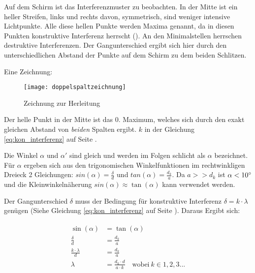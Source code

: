 Auf dem Schirm ist das Interferenzmuster zu beobachten. In der Mitte ist ein heller Streifen, links und rechts davon, symmetrisch, sind weniger intensive Lichtpunkte. Alle diese hellen Punkte werden Maxima genannt, da in diesen Punkten konstruktive Interferenz herrscht (). An den Minimalstellen herrschen destruktive Interferenzen. Der Gangunterschied ergibt sich hier durch den unterschiedlichen Abstand der Punkte auf dem Schirm zu dem beiden Schlitzen.

Eine Zeichnung:

\begin{figure}[h!]
		\centering
		\texttt{[image: doppelspaltzeichnung]}
		\caption{Zeichnung zur Herleitung}
\end{figure}

Der helle Punkt in der Mitte ist das 0. Maximum, welches sich durch den exakt gleichen Abstand von \emph{beiden} Spalten ergibt. $k$ in der Gleichung \ref{eq:kon_interferenz} auf Seite \pageref{eq:kon_interferenz}.
	
Die Winkel $\alpha$ und $\alpha '$ sind gleich und werden im Folgen schlicht als $\alpha$ bezeichnet. Für $\alpha$ ergeben sich aus den trigonomischen Winkelfunktionen im rechtwinkligen Dreieck 2 Gleichungen: $sin{(\alpha)}=\frac{\delta}{d}$ und $tan{(\alpha)}=\frac{d_k}{a}$. Da $a>>d_k$ ist $\alpha<10 \degree$ und die Kleinwinkelnäherung $sin{(\alpha)} \approx \tan{(\alpha)}$ kann verwendet werden.

Der Gangunterschied $\delta$ muss der Bedingung für konstruktive Interferenz $\delta = k \cdot \lambda$ genügen (Siehe Gleichung \ref{eq:kon_interferenz} auf Seite \pageref{eq:kon_interferenz}). Daraus Ergibt sich:
	
\begin{align}
\begin{split}
	\sin{(\alpha)} &= \tan{(\alpha)} \\
	\frac{\delta}{d} &= \frac{d_k}{a} \\
	\frac{k \cdot \lambda}{d} &= \frac{d_k}{a} \\
	\lambda &= \frac{d_{k} \cdot d}{a \cdot k} \quad \text{wobei} \ k \in 1,2,3...
\end{split}
\end{align}
	
